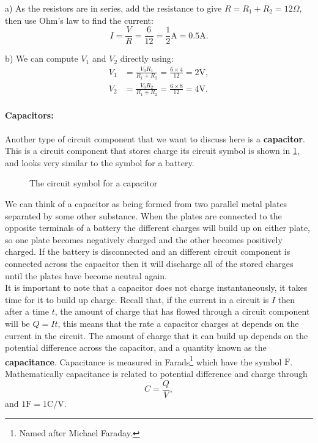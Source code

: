 \documentclass[a4paper,12pt]{book}
\begin{document}
a) As the resistors are in series, add the resistance to give $R=R_{1}+R_{2}=12\Omega$, then use Ohm's law to find the current:
\begin{equation*}
I=\frac{V}{R}=\frac{6}{12}=\frac{1}{2}\text{A}=0.5\text{A}.
\end{equation*}

b) We can compute $V_{1}$ and $V_{2}$ directly using:
\begin{align*}
V_{1}&=\frac{V_{0}R_{1}}{R_{1}+R_{2}}=\frac{6\times 4}{12}=2\text{V},\\
V_{2}&=\frac{V_{0}R_{2}}{R_{1}+R_{2}}=\frac{6\times 8}{12}=4\text{V}.
\end{align*}



\paragraph{Capacitors:} Another type of circuit component that we want to discuss here is a \textbf{capacitor}. This is a circuit component that stores charge its circuit symbol is shown in \cref{fig: capacitor}, and looks very similar to the symbol for a battery.
  \begin{figure}[ht]
    \centering
    \caption{The circuit symbol for a capacitor}
    \label{fig: capacitor}
\end{figure}

We can think of a capacitor as being formed from two parallel metal plates separated by some other substance. When the plates are connected to the opposite terminals of a battery the different charges will build up on either plate, so one plate becomes negatively charged and the other becomes positively charged. If the battery is disconnected and an different circuit component is connected across the capacitor then it will discharge all of the stored charges until the plates have become neutral again.\\

It is important to note that a capacitor does not charge instantaneously, it takes time for it to build up charge. Recall that, if the current in a circuit is $I$ then after a time $t$, the amount of charge that has flowed through a circuit component will be $Q=It$, this means that the rate a capacitor charges at depends on the current in the circuit.  The amount of charge that it can build up depends on the potential difference across the capacitor, and a quantity known as the \textbf{capacitance}. Capacitance is measured in Farads\footnote{Named after Michael Faraday.} which have the symbol $\text{F}$. Mathematically capacitance is related to potential difference and charge through
\begin{equation}
C=\frac{Q}{V},
\label{eq: capacitance eq}
\end{equation} 
and $1\text{F}=1\text{C/V}$.\\
\end{document}
